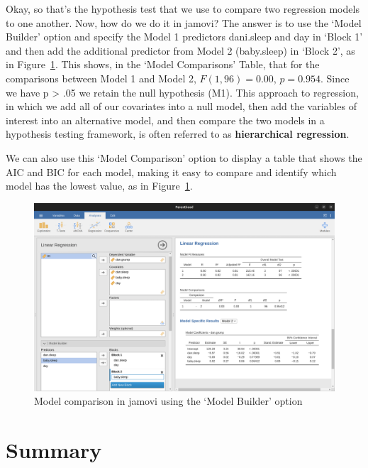 \documentclass[
  a4paper,
]{book}
\begin{document}
Okay, so that's the hypothesis test that we use to compare two
regression models to one another. Now, how do we do it in jamovi? The
answer is to use the `Model Builder' option and specify the Model 1
predictors dani.sleep and day in `Block 1' and then add the additional
predictor from Model 2 (baby.sleep) in `Block 2', as in
Figure~\ref{fig-fig12-28}. This shows, in the `Model Comparisons' Table,
that for the comparisons between Model 1 and Model 2,
\(F(1,96) = 0.00\), \(p = 0.954\). Since we have p \textgreater{} .05 we
retain the null hypothesis (M1). This approach to regression, in which
we add all of our covariates into a null model, then add the variables
of interest into an alternative model, and then compare the two models
in a hypothesis testing framework, is often referred to as
\textbf{hierarchical regression}.

We can also use this `Model Comparison' option to display a table that
shows the AIC and BIC for each model, making it easy to compare and
identify which model has the lowest value, as in
Figure~\ref{fig-fig12-28}.

\begin{figure}[H]

\includegraphics[width=1\textwidth,height=\textheight]{images/fig12-28.png} \hfill{}

\caption{\label{fig-fig12-28}Model comparison in jamovi using the `Model
Builder' option}

\end{figure}

\hypertarget{summary}{%
\section{Summary}\label{summary}}
\end{document}
